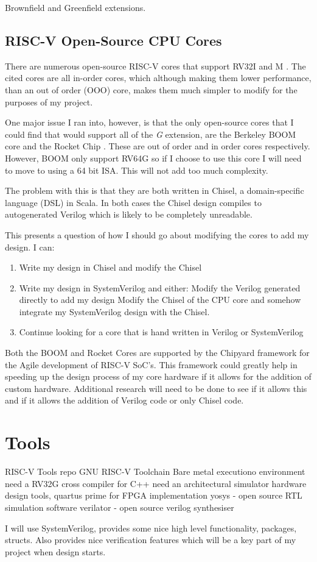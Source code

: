 Brownfield and Greenfield extensions. 
\subsection{RISC-V Open-Source CPU Cores}
There are numerous open-source RISC-V cores that support RV32I and M \cite{nolting22}\cite{ibex}\cite{wyvernsemiriscV}. The cited cores are all in-order cores, which although making them lower performance, than an out of order (OOO) core, makes them much simpler to modify for the purposes of my project. 

One major issue I ran into, however, is that the only open-source cores that I could find that would support all of the \textit{G} extension, are the Berkeley BOOM \cite{zhaosonicboom} core and the Rocket Chip \cite{Asanovic-EECS-2016-17}. These are out of order and in order cores respectively. However, BOOM only support RV64G so if I choose to use this core I will need to move to using a 64 bit ISA. This will not add too much complexity.

The problem with this is that they are both written in Chisel, a domain-specific language (DSL) in Scala. In both cases the Chisel design compiles to autogenerated Verilog which is likely to be completely unreadable. 

\begin{shaded}
This presents a question of how I should go about modifying the cores to add my design. I can:
\begin{enumerate}
    \item Write my design in Chisel and modify the Chisel
    \item Write my design in SystemVerilog and either:
    \subitem Modify the Verilog generated directly to add my design
    \subitem Modify the Chisel of the CPU core and somehow integrate my SystemVerilog design with the Chisel.
    \item Continue looking for a core that is hand written in Verilog or SystemVerilog
\end{enumerate}
\end{shaded}

Both the BOOM and Rocket Cores are supported by the Chipyard\cite{chipyard} framework for the Agile development of RISC-V SoC's. This framework could greatly help in speeding up the design process of my core hardware if it allows for the addition of custom hardware. Additional research will need to be done to see if it allows this and if it allows the addition of Verilog code or only Chisel code.

\section{Tools}
RISC-V Tools repo
GNU RISC-V Toolchain
Bare metal executiono environment
need a RV32G cross compiler for C++
need an architectural simulator
hardware design tools, quartus prime for FPGA implementation
yosys - open source RTL simulation software
verilator - open source verilog synthesiser

I will use SystemVerilog, provides some nice high level functionality, packages, structs. Also provides nice verification features which will be a key part of my project when design starts.